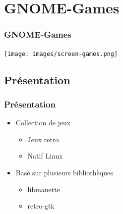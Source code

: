 \documentclass{beamer}
\begin{document}
\section{GNOME-Games}
\begin{frame}
  \frametitle{GNOME-Games}
  \texttt{[image: images/screen-games.png]}
\end{frame}

\subsection{Présentation}
\begin{frame}
  \frametitle{Présentation}
  \begin{itemize}
  \item Collection de jeux
    \begin{itemize}
    \item Jeux retro
    \item Natif Linux
    \end{itemize}
  \item Basé sur plusieurs bibliothèques
    \begin{itemize}
    \item libmanette
    \item retro-gtk
    \end{itemize}
  \end{itemize}
\end{frame}
\end{document}
